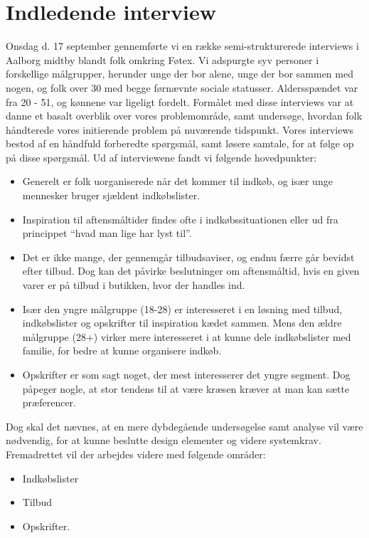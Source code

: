 \chapter{Indledende interview}
Onsdag d. 17 september gennemførte vi en række semi-strukturerede interviews i Aalborg midtby blandt folk omkring Føtex. Vi adspurgte syv personer i forskellige målgrupper, herunder unge der bor alene, unge der bor sammen med nogen, og  folk over 30 med begge førnævnte sociale statusser. Aldersspændet var fra 20 - 51, og kønnene var ligeligt fordelt. Formålet med disse interviews var at danne et basalt overblik over vores problemområde, samt undersøge, hvordan folk håndterede vores initierende problem på nuværende tidspunkt. Vores interviews bestod af en håndfuld forberedte spørgsmål, samt løsere samtale, for at følge op på disse spørgsmål. Ud af interviewene fandt vi følgende hovedpunkter:
\begin{itemize}
	\item Generelt er folk uorganiserede når det kommer til indkøb, og især unge mennesker bruger sjældent indkøbslister.
	\item Inspiration til aftensmåltider findes ofte i indkøbssituationen eller ud fra princippet “hvad man lige har lyst til”.
	\item Det er ikke mange, der gennemgår tilbudsaviser, og endnu færre går bevidst efter tilbud. Dog kan det påvirke beslutninger om aftensmåltid, hvis en given varer er på tilbud i butikken, hvor der handles ind.
	\item Især den yngre målgruppe (18-28) er interesseret i en løsning med tilbud, indkøbslister og opskrifter til inspiration kædet sammen. Mens den ældre målgruppe (28+) virker mere interesseret i at kunne dele indkøbslister med familie, for bedre at kunne organisere indkøb.
	\item Opskrifter er som sagt noget, der mest interesserer det yngre segment. Dog påpeger nogle, at stor tendens til at være kræsen kræver at man kan sætte præferencer. 
\end{itemize}

Dog skal det nævnes, at en mere dybdegående undersøgelse samt analyse vil være nødvendig, for at kunne beslutte design elementer og videre systemkrav.     Fremadrettet vil der arbejdes videre med følgende områder:

\begin{itemize}
	\item Indkøbslister
	\item Tilbud
	\item Opskrifter.
\end{itemize}
